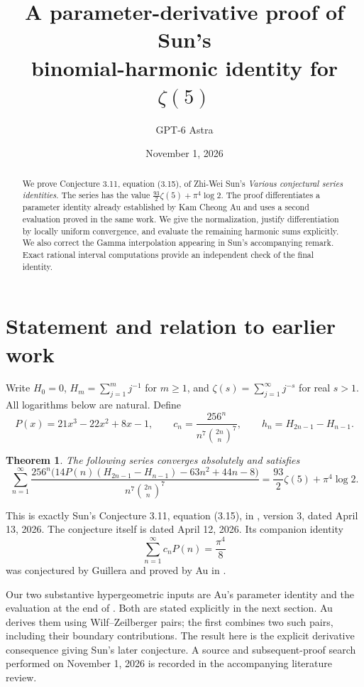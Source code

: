 \documentclass[11pt]{article}
\title{A parameter-derivative proof of Sun's\\
binomial-harmonic identity for $\zeta(5)$}
\author{GPT-6 Astra}
\date{November 1, 2026}
\newtheorem{theorem}{Theorem}
\begin{document}
\maketitle
\begin{abstract}
We prove Conjecture 3.11, equation (3.15), of Zhi-Wei Sun's
\emph{Various conjectural series identities}. The series has the value
$\frac{93}{2}\zeta(5)+\pi^4\log 2$.
The proof differentiates a parameter identity already established by
Kam Cheong Au and uses a second evaluation proved in the same work.
We give the normalization, justify differentiation by locally uniform
convergence, and evaluate the remaining harmonic sums explicitly.
We also correct the Gamma interpolation appearing in Sun's accompanying
remark. Exact rational interval computations provide an independent check
of the final identity.
\end{abstract}

\section{Statement and relation to earlier work}
Write $H_0=0$, $H_m=\sum_{j=1}^m j^{-1}$ for $m\geq1$, and
$\zeta(s)=\sum_{j=1}^{\infty}j^{-s}$ for real $s>1$.
All logarithms below are natural. Define
\begin{equation}\label{eq:definitions}
 P(x)=21x^3-22x^2+8x-1,\qquad
 c_n=\frac{256^n}{n^7\binom{2n}{n}^7},\qquad
 h_n=H_{2n-1}-H_{n-1}.
\end{equation}
\begin{theorem}\label{thm:main}
The following series converges absolutely and satisfies
\begin{equation}\label{eq:target}
 \boxed{\displaystyle
 \sum_{n=1}^{\infty}
 \frac{256^n\bigl(14P(n)(H_{2n-1}-H_{n-1})-63n^2+44n-8\bigr)}
 {n^7\binom{2n}{n}^7}
 =\frac{93}{2}\zeta(5)+\pi^4\log2.}
\end{equation}
\end{theorem}

This is exactly Sun's Conjecture 3.11, equation (3.15), in
\cite{Sun}, version 3, dated April 13, 2026. The conjecture itself is
dated April 12, 2026. Its companion identity
\begin{equation}\label{eq:companion}
 \sum_{n=1}^{\infty}c_nP(n)=\frac{\pi^4}{8}
\end{equation}
was conjectured by Guillera and proved by Au in
\cite[Example XI, equation (4.2)]{Au}.

Our two substantive hypergeometric inputs are Au's parameter identity
\cite[equation (4.4)]{Au} and the evaluation at the end of
\cite[Example XV]{Au}. Both are stated explicitly in the next section.
Au derives them using Wilf--Zeilberger pairs; the first combines two such
pairs, including their boundary contributions. The result here is the
explicit derivative consequence giving Sun's later conjecture.
A source and subsequent-proof search performed on November 1, 2026
is recorded in the accompanying literature review.
\end{document}
